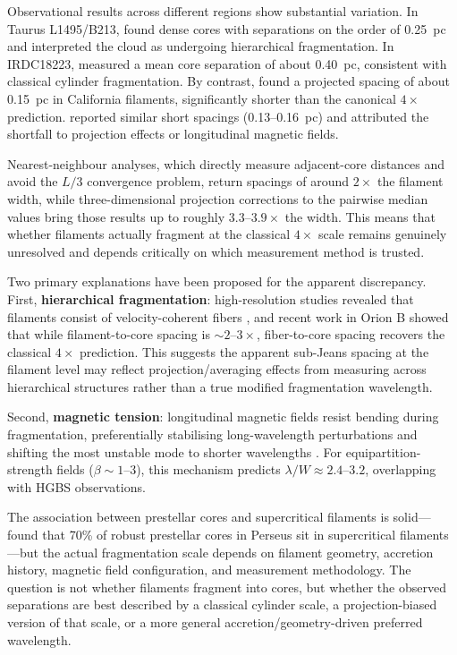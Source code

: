 \documentclass[twocolumn,usenatbib]{mnras}
\begin{document}
Observational results across different regions show substantial variation. In Taurus L1495/B213, \citet{Hacar2013} found dense cores with separations on the order of 0.25~pc and interpreted the cloud as undergoing hierarchical fragmentation. In IRDC18223, \citet{Beuther2015} measured a mean core separation of about 0.40~pc, consistent with classical cylinder fragmentation. By contrast, \citet{Zhang2020} found a projected spacing of about 0.15~pc in California filaments, significantly shorter than the canonical $4\times$ prediction. \citet{Chung2023} reported similar short spacings (0.13--0.16~pc) and attributed the shortfall to projection effects or longitudinal magnetic fields.

Nearest-neighbour analyses, which directly measure adjacent-core distances and avoid the $L/3$ convergence problem, return spacings of around $2\times$ the filament width, while three-dimensional projection corrections to the pairwise median values bring those results up to roughly $3.3$--$3.9\times$ the width. This means that whether filaments actually fragment at the classical $4\times$ scale remains genuinely unresolved and depends critically on which measurement method is trusted.

Two primary explanations have been proposed for the apparent discrepancy. First, \textbf{hierarchical fragmentation}: high-resolution studies revealed that filaments consist of velocity-coherent fibers \citep{Hacar2013}, and recent work in Orion B \citep{Yang2024} showed that while filament-to-core spacing is $\sim2$--$3\times$, fiber-to-core spacing recovers the classical $4\times$ prediction. This suggests the apparent sub-Jeans spacing at the filament level may reflect projection/averaging effects from measuring across hierarchical structures rather than a true modified fragmentation wavelength.

Second, \textbf{magnetic tension}: longitudinal magnetic fields resist bending during fragmentation, preferentially stabilising long-wavelength perturbations and shifting the most unstable mode to shorter wavelengths \citep{Nakamura1993}. For equipartition-strength fields ($\beta \sim 1$--$3$), this mechanism predicts $\lambda/W \approx 2.4$--$3.2$, overlapping with HGBS observations.

The association between prestellar cores and supercritical filaments is solid---\citet{Andre2017} found that 70\% of robust prestellar cores in Perseus sit in supercritical filaments---but the actual fragmentation scale depends on filament geometry, accretion history, magnetic field configuration, and measurement methodology. The question is not whether filaments fragment into cores, but whether the observed separations are best described by a classical cylinder scale, a projection-biased version of that scale, or a more general accretion/geometry-driven preferred wavelength.
\end{document}
